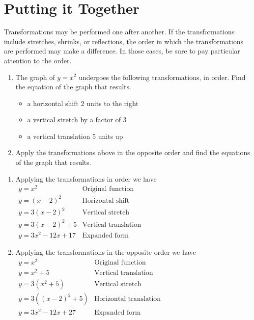 \documentclass[handout, noauthor, nooutcomes]{ximera}
\begin{document}

\section{Putting it Together}
Transformations may be performed one after another. If the transformations include stretches, shrinks, or reflections, the order in which the transformations are performed may make a difference. In those cases, be sure to pay particular attention to the order.

\begin{example}
\begin{enumerate}
\item The graph of $y=x^2$ undergoes the following transformations, in order. Find the equation of the graph that results.
\begin{itemize}
\item a horizontal shift 2 units to the right
\item a vertical stretch by a factor of 3
\item a vertical translation 5 units up
\end{itemize}
\item Apply the transformations above in the opposite order and find the equations of the graph that results.
\end{enumerate}
\begin{explanation}
\begin{enumerate}
\item Applying the transformations in order we have\\
$
\begin{array}{lc}
y = x^2& \text{Original function}\\
y = (x-2)^2& \text{Horizontal shift} \\
y = 3(x-2)^2& \text{Vertical stretch} \\
y = 3(x-2)^2+5& \text{Vertical translation}\\
y = 3x^2 - 12x + 17& \text{Expanded form}
\end{array}
$
\item Applying the transformations in the opposite order we have\\
$
\begin{array}{lc}
y = x^2& \text{Original function}\\
y = x^2 + 5 & \text{Vertical translation} \\
y = 3(x^2+5)& \text{Vertical stretch} \\
y = 3((x-2)^2+5) & \text{Horizontal translation}\\
y = 3x^2 - 12x + 27& \text{Expanded form}
\end{array}
$
\end{enumerate}
\end{explanation}
\end{example}

%
\end{document}
